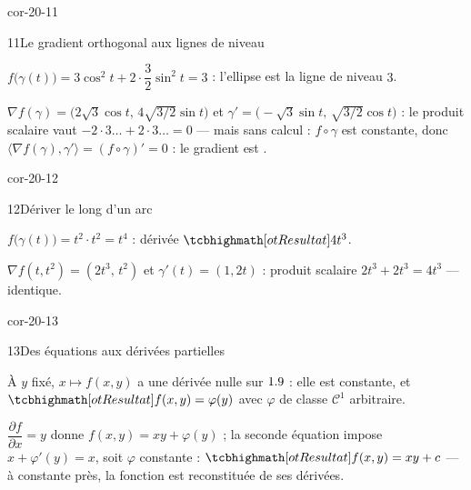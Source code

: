 \begin{blocLivre}{cor-20-11}
\begin{corrige}{11}{Le gradient orthogonal aux lignes de niveau}
\begin{questions}
  \item $f\bigl(\gamma(t)\bigr)=3\cos^{2}t+2\cdot\dfrac32\sin^{2}t=3$ :
    l'ellipse est la ligne de niveau $3$.
  \item $\nabla f(\gamma)=\bigl(2\sqrt3\cos t,\,4\sqrt{3/2}\sin t\bigr)$
    et $\gamma'=\bigl(-\sqrt3\sin t,\,\sqrt{3/2}\cos t\bigr)$ : le
    produit scalaire vaut $-2\cdot3\ldots+2\cdot3\ldots=0$ — mais sans
    calcul : $f\circ\gamma$ est constante, donc
    $\langle\nabla f(\gamma),\gamma'\rangle=(f\circ\gamma)'=0$ : le
    gradient est .
\end{questions}
\end{corrige}
\end{blocLivre}

\begin{blocLivre}{cor-20-12}
\begin{corrige}{12}{Dériver le long d'un arc}
\begin{questions}
  \item $f\bigl(\gamma(t)\bigr)=t^{2}\cdot t^{2}=t^{4}$ : dérivée
    $\res{4t^{3}}$.
  \item $\nabla f(t,t^{2})=(2t^{3},\,t^{2})$ et
    $\gamma'(t)=(1,2t)$ : produit scalaire
    $2t^{3}+2t^{3}=4t^{3}$ — identique.
\end{questions}
\end{corrige}
\end{blocLivre}

\begin{blocLivre}{cor-20-13}
\begin{corrige}{13}{Des équations aux dérivées partielles}
\begin{questions}
  \item À $y$ fixé, $x\mapsto f(x,y)$ a une dérivée nulle sur $1.9$ :
    elle est constante, et $\res{f(x,y)=\varphi(y)}$ avec $\varphi$ de
    classe $\mathcal{C}^{1}$ arbitraire.
  \item $\dfrac{\partial f}{\partial x}=y$ donne
    $f(x,y)=xy+\varphi(y)$ ; la seconde équation impose
    $x+\varphi'(y)=x$, soit $\varphi$ constante :
    $\res{f(x,y)=xy+c}$ — à constante près, la fonction est
    reconstituée de ses dérivées.
\end{questions}
\end{corrige}
\end{blocLivre}

